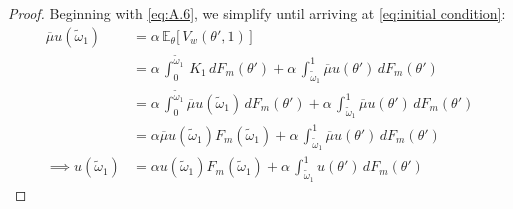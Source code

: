 \begin{proof}
Beginning with \autoref{eq:A.6}, we simplify until arriving at \autoref{eq:initial condition}: 
\begin{equation*} 
    \begin{split}
        \overline\mu u(\widetilde\omega_1) &= \alpha \, \mathbb{E}_\theta\Big[\,V_w(\theta',1)\,\Big]\\
        &= \alpha \,\int^{\widetilde\omega_1}_0\,K_1\,dF_m(\theta') + \alpha \,\int_{\widetilde\omega_1}^1 \overline\mu u(\theta')\,dF_m(\theta')\\
        &= \alpha \,\int^{\widetilde\omega_1}_0 \overline\mu u(\widetilde\omega_1)\,dF_m(\theta') + \alpha \,\int_{\widetilde\omega_1}^1 \overline\mu u(\theta')\,dF_m(\theta')\\
        &= \alpha \overline\mu u(\widetilde\omega_1)F_m(\widetilde\omega_1) + \alpha \,\int_{\widetilde\omega_1}^1 \overline\mu u(\theta')\,dF_m(\theta')\\
        \implies u(\widetilde\omega_1) &= \alpha u(\widetilde\omega_1)F_m(\widetilde\omega_1) + \alpha \,\int_{\widetilde\omega_1}^1 u(\theta')\,dF_m(\theta') 
    \end{split}
\end{equation*}  

\end{proof}
